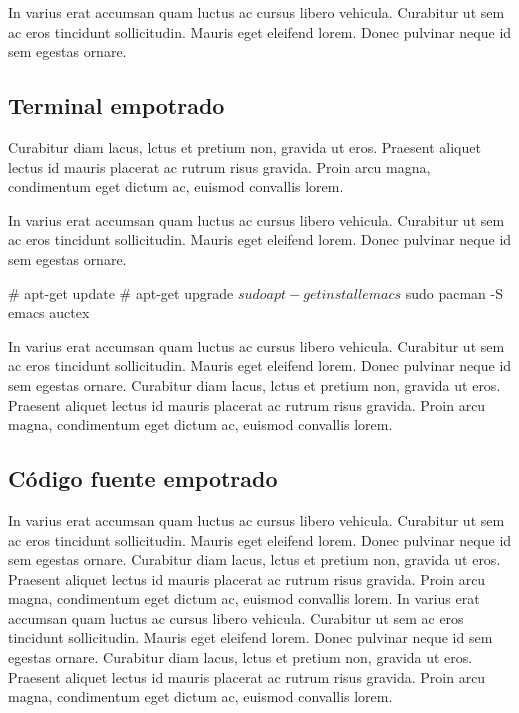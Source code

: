 In varius erat accumsan quam luctus ac cursus libero vehicula. Curabitur ut sem ac eros tincidunt sollicitudin. Mauris eget eleifend lorem. Donec pulvinar neque id sem egestas ornare.

\subsection{Terminal empotrado}

Curabitur diam lacus, lctus et pretium non, gravida ut eros. Praesent aliquet lectus id mauris placerat ac rutrum risus gravida. Proin arcu magna, condimentum eget dictum ac, euismod convallis lorem. 

In varius erat accumsan quam luctus ac cursus libero vehicula. Curabitur ut sem ac eros tincidunt sollicitudin. Mauris eget eleifend lorem. Donec pulvinar neque id sem egestas ornare.

\begin{term}
# apt-get update
# apt-get upgrade
$ sudo apt-get install emacs
$ sudo pacman -S emacs auctex
\end{term}

In varius erat accumsan quam luctus ac cursus libero vehicula. Curabitur ut sem ac eros tincidunt sollicitudin. Mauris eget eleifend lorem. Donec pulvinar neque id sem egestas ornare. Curabitur diam lacus, lctus et pretium non, gravida ut eros. Praesent aliquet lectus id mauris placerat ac rutrum risus gravida. Proin arcu magna, condimentum eget dictum ac, euismod convallis lorem. 

\subsection{Código fuente empotrado}

In varius erat accumsan quam luctus ac cursus libero vehicula. Curabitur ut sem ac eros tincidunt sollicitudin. Mauris eget eleifend lorem. Donec pulvinar neque id sem egestas ornare. Curabitur diam lacus, lctus et pretium non, gravida ut eros. Praesent aliquet lectus id mauris placerat ac rutrum risus gravida. Proin arcu magna, condimentum eget dictum ac, euismod convallis lorem. In varius erat accumsan quam luctus ac cursus libero vehicula. Curabitur ut sem ac eros tincidunt sollicitudin. Mauris eget eleifend lorem. Donec pulvinar neque id sem egestas ornare. Curabitur diam lacus, lctus et pretium non, gravida ut eros. Praesent aliquet lectus id mauris placerat ac rutrum risus gravida. Proin arcu magna, condimentum eget dictum ac, euismod convallis lorem. 

